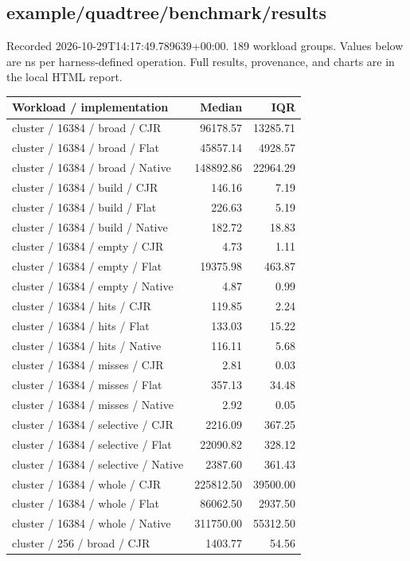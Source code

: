 \subsection{example/quadtree/benchmark/results}
Recorded 2026-10-29T14:17:49.789639+00:00. 189 workload groups. Values below are ns per harness-defined operation. Full results, provenance, and charts are in the local HTML report.
\begin{longtable}{p{}rr}Workload / implementation & Median & IQR \\ \hline
cluster / 16384 / broad / CJR & 96178.57 & 13285.71 \\
cluster / 16384 / broad / Flat & 45857.14 & 4928.57 \\
cluster / 16384 / broad / Native & 148892.86 & 22964.29 \\
cluster / 16384 / build / CJR & 146.16 & 7.19 \\
cluster / 16384 / build / Flat & 226.63 & 5.19 \\
cluster / 16384 / build / Native & 182.72 & 18.83 \\
cluster / 16384 / empty / CJR & 4.73 & 1.11 \\
cluster / 16384 / empty / Flat & 19375.98 & 463.87 \\
cluster / 16384 / empty / Native & 4.87 & 0.99 \\
cluster / 16384 / hits / CJR & 119.85 & 2.24 \\
cluster / 16384 / hits / Flat & 133.03 & 15.22 \\
cluster / 16384 / hits / Native & 116.11 & 5.68 \\
cluster / 16384 / misses / CJR & 2.81 & 0.03 \\
cluster / 16384 / misses / Flat & 357.13 & 34.48 \\
cluster / 16384 / misses / Native & 2.92 & 0.05 \\
cluster / 16384 / selective / CJR & 2216.09 & 367.25 \\
cluster / 16384 / selective / Flat & 22090.82 & 328.12 \\
cluster / 16384 / selective / Native & 2387.60 & 361.43 \\
cluster / 16384 / whole / CJR & 225812.50 & 39500.00 \\
cluster / 16384 / whole / Flat & 86062.50 & 2937.50 \\
cluster / 16384 / whole / Native & 311750.00 & 55312.50 \\
cluster / 256 / broad / CJR & 1403.77 & 54.56 \\

\end{longtable}
